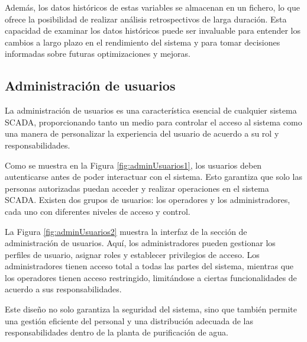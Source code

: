 Además, los datos históricos de estas variables se almacenan en un fichero, lo que ofrece la posibilidad de realizar análisis retrospectivos de larga duración. Esta capacidad de examinar los datos históricos puede ser invaluable para entender los cambios a largo plazo en el rendimiento del sistema y para tomar decisiones informadas sobre futuras optimizaciones y mejoras.

\subsection{Administración de usuarios}

La administración de usuarios es una característica esencial de cualquier sistema SCADA, proporcionando tanto un medio para controlar el acceso al sistema como una manera de personalizar la experiencia del usuario de acuerdo a su rol y responsabilidades.


Como se muestra en la Figura \ref{fig:adminUsuarios1}, los usuarios deben autenticarse antes de poder interactuar con el sistema. Esto garantiza que solo las personas autorizadas puedan acceder y realizar operaciones en el sistema SCADA. Existen dos grupos de usuarios: los operadores y los administradores, cada uno con diferentes niveles de acceso y control.


La Figura \ref{fig:adminUsuarios2} muestra la interfaz de la sección de administración de usuarios. Aquí, los administradores pueden gestionar los perfiles de usuario, asignar roles y establecer privilegios de acceso. Los administradores tienen acceso total a todas las partes del sistema, mientras que los operadores tienen acceso restringido, limitándose a ciertas funcionalidades de acuerdo a sus responsabilidades.

Este diseño no solo garantiza la seguridad del sistema, sino que también permite una gestión eficiente del personal y una distribución adecuada de las responsabilidades dentro de la planta de purificación de agua.



